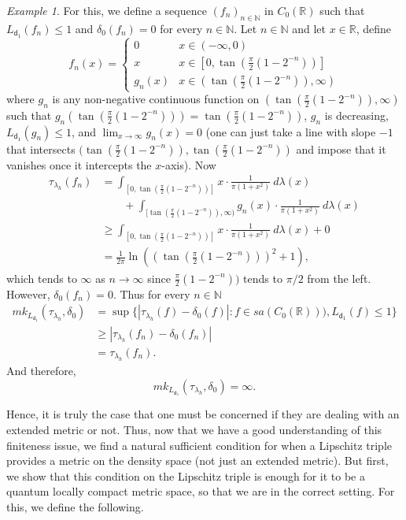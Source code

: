 \documentclass{amsart}
\theoremstyle{plain}
\theoremstyle{definition}
\theoremstyle{remark}
\newtheorem{example}[theorem]{Example}
\numberwithin{equation}{section}
\newcommand{\la}{{\lambda}}
\newcommand{\de}{{\delta}}
\newcommand{\dd}{{\mathsf{d}}}
\newcommand{\N}{{\mathds{N}}}
\newcommand{\R}{{\mathds{R}}}
\renewcommand{\geq}{\geqslant}
\renewcommand{\leq}{\leqslant}
\begin{document}
\begin{example}
    For this, we define a sequence $(f_n)_{n\in \N}$ in $C_0(\R)$ such that $L_{\dd_1}(f_n)\leq 1$ and $\de_0(f_n)=0$ for every $n\in \N$. Let $n\in \N$ and let $x\in \R$, define
    \[
    f_n(x)=\begin{cases}
        0 & x\in (-\infty, 0)\\
       x  & x\in [0, \tan(\frac{\pi}{2}(1-2^{-n}))]\\
     g_n(x) & x\in ( \tan(\frac{\pi}{2}(1-2^{-n})), \infty)
    \end{cases}
    \]
    where $g_n$ is any non-negative continuous function on $( \tan(\frac{\pi}{2}(1-2^{-n})), \infty)$ such that $g_n(\tan(\frac{\pi}{2}(1-2^{-n})))=\tan(\frac{\pi}{2}(1-2^{-n}))$, $g_n$ is decreasing,  $L_{\dd_1}(g_n)\leq 1$, and $\lim_{x\to\infty} g_n(x)=0$ (one can just take a line with slope $-1$ that intersects $(\tan(\frac{\pi}{2}(1-2^{-n})),\tan(\frac{\pi}{2}(1-2^{-n}))$ and impose that it vanishes once it intercepts the $x$-axis).  Now
    \begin{align*}
       \tau_{\la_h}(f_n)&=\int_{[0,\tan(\frac{\pi}{2}(1-2^{-n}))]} x\cdot \frac{1}{\pi(1+x^2)} \ d\la(x) \\
        & \quad \quad + \int_{[\tan(\frac{\pi}{2}(1-2^{-n})), \infty)} g_n(x)  \cdot \frac{1}{\pi(1+x^2)} \ d\la(x) \\
        & \geq \int_{[0,\tan(\frac{\pi}{2}(1-2^{-n}))]} x\cdot \frac{1}{\pi(1+x^2)} \ d\la(x)+0\\
        & = \frac{1}{2\pi}\ln\left(\left( \tan\left(\frac{\pi}{2}(1-2^{-n})\right)\right)^2+1 \right),
    \end{align*}
    which tends to $\infty$ as $n \to \infty$ since $\frac{\pi}{2}(1-2^{-n}))$ tends to $\pi/2$ from the left. However, $\de_0(f_n)=0$. Thus for every $n\in \N$
    \begin{align*}
        mk_{L_{\dd_1}}(\tau_{\la_h}, \de_0)& = \sup \{|\tau_{\la_h}(f)-\de_0(f)| : f\in sa(C_0(\R))), L_{\dd_1}(f)\leq 1 \}\\
        & \geq |\tau_{\la_h}(f_n)-\de_0(f_n)|\\
        & = \tau_{\la_h}(f_n).
    \end{align*}
    And therefore, 
    \[
      mk_{L_{\dd_1}}(\tau_{\la_h}, \de_0)=\infty.
    \]
\end{example}
Hence, it is truly the case that one must be concerned if they are dealing with an extended metric or not. Thus, now that we have a good understanding of this finiteness issue, we find a natural  sufficient condition for when a Lipschitz triple provides a metric on the density space (not just an extended metric). But first, we show that this condition on the Lipschitz triple is enough for it to be a quantum locally compact metric space, so that we are   in the correct setting. For this, we define the following.
\end{document}

